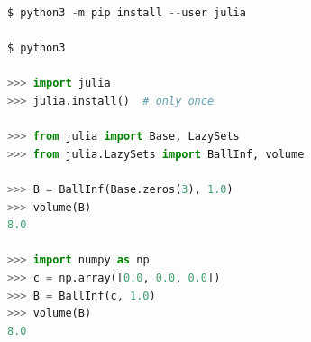 \begin{minipage}{\linewidth}
	\begin{lstlisting}[language=python]
$ python3 -m pip install --user julia

$ python3

>>> import julia
>>> julia.install()  # only once

>>> from julia import Base, LazySets
>>> from julia.LazySets import BallInf, volume

>>> B = BallInf(Base.zeros(3), 1.0)
>>> volume(B)
8.0

>>> import numpy as np
>>> c = np.array([0.0, 0.0, 0.0])
>>> B = BallInf(c, 1.0)
>>> volume(B)
8.0
	\end{lstlisting}
\end{minipage}
